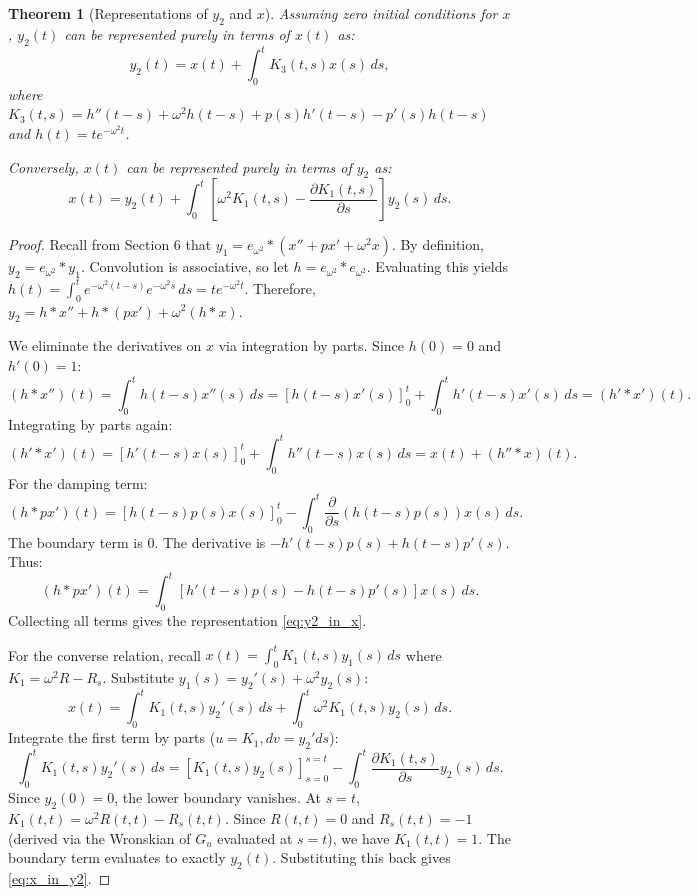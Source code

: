 \documentclass[10pt,reqno]{amsart}
\newtheorem{theorem}{Theorem}
\theoremstyle{definition}
\begin{document}
	\begin{theorem}[Representations of $y_2$ and $x$]
		Assuming zero initial conditions for $x$, $y_2(t)$ can be represented purely in terms of $x(t)$ as:
		\begin{equation} \label{eq:y2_in_x}
			y_2(t) = x(t) + \int_0^t K_3(t, s) x(s) \, ds,
		\end{equation}
		where $K_3(t, s) = h''(t-s) + \omega^2 h(t-s) + p(s)h'(t-s) - p'(s)h(t-s)$ and $h(t) = t e^{-\omega^2 t}$.
		
		Conversely, $x(t)$ can be represented purely in terms of $y_2$ as:
		\begin{equation} \label{eq:x_in_y2}
			x(t) = y_2(t) + \int_0^t \left[ \omega^2 K_1(t, s) - \frac{\partial K_1(t, s)}{\partial s} \right] y_2(s) \, ds.
		\end{equation}
	\end{theorem}
	
	\begin{proof}
		Recall from Section 6 that $y_1 = e_{\omega^2} * (x'' + px' + \omega^2 x)$. By definition, $y_2 = e_{\omega^2} * y_1$. Convolution is associative, so let $h = e_{\omega^2} * e_{\omega^2}$. Evaluating this yields $h(t) = \int_0^t e^{-\omega^2(t-s)} e^{-\omega^2 s} \, ds = t e^{-\omega^2 t}$.
		Therefore, $y_2 = h * x'' + h * (px') + \omega^2(h * x)$. 
		
		We eliminate the derivatives on $x$ via integration by parts. Since $h(0) = 0$ and $h'(0) = 1$:
		\[ (h * x'')(t) = \int_0^t h(t-s) x''(s) \, ds = \left[ h(t-s)x'(s) \right]_0^t + \int_0^t h'(t-s) x'(s) \, ds = (h' * x')(t). \]
		Integrating by parts again:
		\[ (h' * x')(t) = \left[ h'(t-s)x(s) \right]_0^t + \int_0^t h''(t-s) x(s) \, ds = x(t) + (h'' * x)(t). \]
		For the damping term:
		\[ (h * px')(t) = \left[ h(t-s)p(s)x(s) \right]_0^t - \int_0^t \frac{\partial}{\partial s}\left(h(t-s)p(s)\right) x(s) \, ds. \]
		The boundary term is $0$. The derivative is $-h'(t-s)p(s) + h(t-s)p'(s)$. Thus:
		\[ (h * px')(t) = \int_0^t \left[ h'(t-s)p(s) - h(t-s)p'(s) \right] x(s) \, ds. \]
		Collecting all terms gives the representation \eqref{eq:y2_in_x}.
		
		For the converse relation, recall $x(t) = \int_0^t K_1(t, s) y_1(s) \, ds$ where $K_1 = \omega^2 R - R_s$. Substitute $y_1(s) = y_2'(s) + \omega^2 y_2(s)$:
		\[ x(t) = \int_0^t K_1(t, s) y_2'(s) \, ds + \int_0^t \omega^2 K_1(t, s) y_2(s) \, ds. \]
		Integrate the first term by parts ($u = K_1, dv = y_2' ds$):
		\[ \int_0^t K_1(t, s) y_2'(s) \, ds = \left[ K_1(t, s)y_2(s) \right]_{s=0}^{s=t} - \int_0^t \frac{\partial K_1(t, s)}{\partial s} y_2(s) \, ds. \]
		Since $y_2(0) = 0$, the lower boundary vanishes. At $s=t$, $K_1(t, t) = \omega^2 R(t, t) - R_s(t, t)$. Since $R(t, t) = 0$ and $R_s(t, t) = -1$ (derived via the Wronskian of $G_u$ evaluated at $s=t$), we have $K_1(t, t) = 1$. The boundary term evaluates to exactly $y_2(t)$. Substituting this back gives \eqref{eq:x_in_y2}.
	\end{proof}
	
\end{document}
